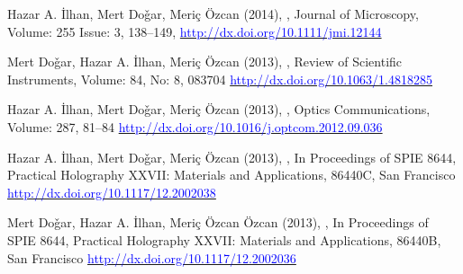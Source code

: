 \documentclass[11pt,a4paper,helvet]{moderncv}
\begin{document}
\begin{thebibliography}{}

\bibitem {}
Hazar A. \.Ilhan, Mert Do\v{g}ar, Meri\c{c} \"Ozcan (2014),
,
\newblock Journal of Microscopy, Volume: 255 Issue: 3, 138--149, 
\newblock \newline{} \href{http://dx.doi.org/10.1111/jmi.12144}{\textcolor{blue}{http://dx.doi.org/10.1111/jmi.12144}}

\bibitem {}
Mert Do\v{g}ar, Hazar A. \.Ilhan, Meri\c{c} \"Ozcan (2013),
,
\newblock Review of Scientific Instruments, Volume: 84, No: 8, 083704
\newblock \newline{} \href{http://dx.doi.org/10.1063/1.4818285}{\textcolor{blue}{http://dx.doi.org/10.1063/1.4818285}}

\bibitem {}
Hazar A. \.Ilhan, Mert Do\v{g}ar, Meri\c{c} \"Ozcan (2013),
,
\newblock Optics Communications, Volume: 287, 81--84
\newblock \newline{} \href{http://dx.doi.org/10.1016/j.optcom.2012.09.036}{\textcolor{blue}{http://dx.doi.org/10.1016/j.optcom.2012.09.036}}

\bibitem {}
Hazar A. \.Ilhan, Mert Do\v{g}ar, Meri\c{c} \"Ozcan (2013),
,
\newblock In Proceedings of SPIE 8644, Practical Holography XXVII: Materials and Applications, 86440C, San Francisco
\newblock \newline{} \href{http://dx.doi.org/10.1117/12.2002038}{\textcolor{blue}{http://dx.doi.org/10.1117/12.2002038}}

\bibitem {}
Mert Do\v{g}ar, Hazar A. \.Ilhan, Meri\c{c} \"Ozcan \"Ozcan (2013),
,
\newblock In Proceedings of SPIE 8644, Practical Holography XXVII: Materials and Applications, 86440B, San Francisco
\newblock \newline{} \href{http://dx.doi.org/10.1117/12.2002036}{\textcolor{blue}{http://dx.doi.org/10.1117/12.2002036}}

\end{thebibliography}
\end{document}
